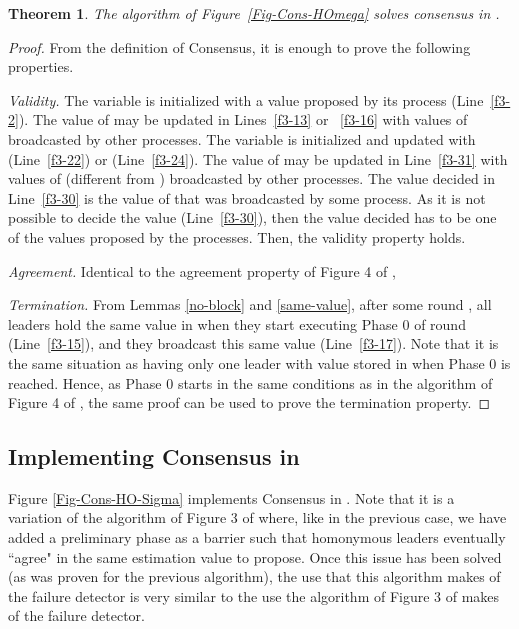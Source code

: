 \documentclass[10pt, conference, compsocconf]{IEEEtran}
\newtheorem{theorem}{Theorem}
\begin{document}
\begin{theorem}
\label{thm:consensus1}
The algorithm of Figure~\ref{Fig-Cons-HOmega} 
solves consensus in .
\end{theorem}
\begin{proof}
From the definition of Consensus, 
it is enough to prove the following properties.

\emph{Validity.} 
The variable   is  initialized with a  value proposed by  its process
(Line~\ref{f3-2}). The value of   may be updated in Lines~\ref{f3-13}
or ~\ref{f3-16} with  values of  broadcasted by  other processes. The
variable  is initialized  and updated with   (Line~\ref{f3-22})
or    (Line~\ref{f3-24}). The  value  of    may be  updated  in
Line~\ref{f3-31} with values of   (different from ) broadcasted
by other processes.  The value decided in Line~\ref{f3-30}  is the value of
  that was  broadcasted by  some process.  As it  is not  possible to
decide the value   (Line~\ref{f3-30}), then the value  decided has to
be  one  of the  values  proposed by  the  processes.  Then,  the  validity
property holds.   

\emph{Agreement.} 
Identical to the agreement property of 
Figure 4 of \cite{DBLP:conf/aina/BonnetR10},

\emph{Termination.}
From Lemmas \ref{no-block} and  \ref{same-value}, after some round , all
leaders  
hold the  same value   in   when they  start executing Phase  0 of
round   (Line~\ref{f3-15}),  and  they broadcast  this  same value  
(Line~\ref{f3-17}). Note that it is the same situation as having only  
one leader with value  stored  in  when Phase 0 is reached. Hence,
as Phase 0 starts in the same conditions as in the algorithm of Figure 4 of
\cite{DBLP:conf/aina/BonnetR10}, the  same proof can  be used to  prove the
termination property. 
\end{proof}

\subsection{Implementing Consensus in }
Figure      \ref{Fig-Cons-HO-Sigma}       implements      Consensus      in
. Note  that it is  a variation of the  algorithm of
Figure  3 of  \cite{DBLP:conf/wdag/BonnetR10} where,  like in  the previous
case, we have  added a preliminary phase as a  barrier such that homonymous
leaders  eventually  ``agree"  in  the  same  estimation  value    to
propose. Once  this issue has been  solved (as was proven  for the previous
algorithm), the use that this algorithm makes of the 
failure detector  is very similar to the use the algorithm of Figure 3
of \cite{DBLP:conf/wdag/BonnetR10} makes of the  failure detector.  
\end{document}
